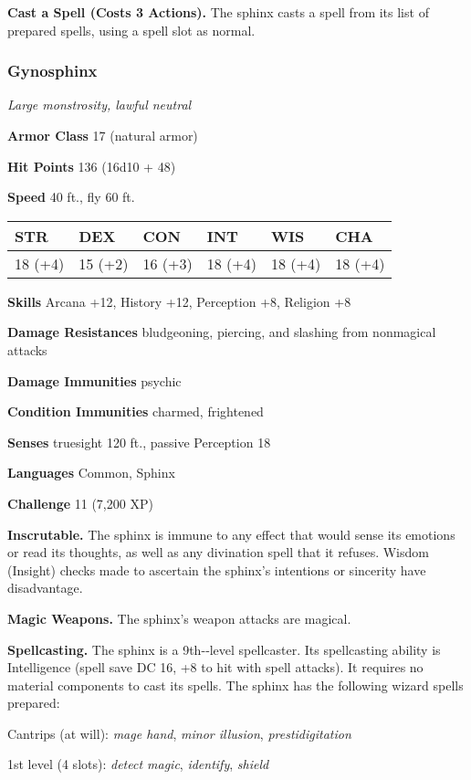 \documentclass[
]{article}
\begin{document}
\textbf{Cast a Spell (Costs 3 Actions).} The sphinx casts a spell from
its list of prepared spells, using a spell slot as normal.

\hypertarget{gynosphinx}{%
\subsubsection{Gynosphinx}\label{gynosphinx}}

\emph{Large monstrosity, lawful neutral}

\textbf{Armor Class} 17 (natural armor)

\textbf{Hit Points} 136 (16d10 + 48)

\textbf{Speed} 40 ft., fly 60 ft.

\begin{longtable}[]{@{}llllll@{}}
\toprule
STR & DEX & CON & INT & WIS & CHA\tabularnewline
\midrule
\endhead
18 (+4) & 15 (+2) & 16 (+3) & 18 (+4) & 18 (+4) & 18 (+4)\tabularnewline
\bottomrule
\end{longtable}

\textbf{Skills} Arcana +12, History +12, Perception +8, Religion +8

\textbf{Damage Resistances} bludgeoning, piercing, and slashing from
nonmagical attacks

\textbf{Damage Immunities} psychic

\textbf{Condition Immunities} charmed, frightened

\textbf{Senses} truesight 120 ft., passive Perception 18

\textbf{Languages} Common, Sphinx

\textbf{Challenge} 11 (7,200 XP)

\textbf{Inscrutable.} The sphinx is immune to any effect that would
sense its emotions or read its thoughts, as well as any divination spell
that it refuses. Wisdom (Insight) checks made to ascertain the sphinx's
intentions or sincerity have disadvantage.

\textbf{Magic Weapons.} The sphinx's weapon attacks are magical.

\textbf{Spellcasting.} The sphinx is a 9th-­‐level spellcaster. Its
spellcasting ability is Intelligence (spell save DC 16, +8 to hit with
spell attacks). It requires no material components to cast its spells.
The sphinx has the following wizard spells prepared:

Cantrips (at will): \emph{mage hand}, \emph{minor illusion},
\emph{prestidigitation}

1st level (4 slots): \emph{detect magic}, \emph{identify}, \emph{shield}
\end{document}
